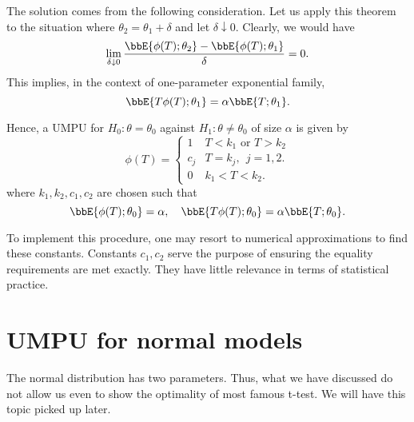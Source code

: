 The solution comes from the following consideration.
Let us apply this theorem to the situation where
$\theta_2 = \theta_1 + \delta$ and let $\delta \downarrow 0$.
Clearly, we would have
\[
\lim_{\delta \downarrow 0} \frac{\bbE\{ \phi(T); \theta_2 \} - \bbE\{ \phi(T); \theta_1 \}}{\delta} = 0.
\]
This implies, in the context of one-parameter exponential family,
\[
\bbE\{ T \phi(T); \theta_1 \} = \alpha \bbE\{ T; \theta_1 \}.
\]

Hence, a UMPU for $H_0: \theta = \theta_0$ 
against $H_1: \theta \neq \theta_0$
 of size $\alpha$ is given by
\[
\phi(T)
=
\left \{
\begin{array}{ll}
1  & T  < k_1 \mbox{  or  } T > k_2\\
c_j &   T= k_j,~~ j=1, 2.\\
0  & k_1 < T < k_2.
\end{array}
\right .
\]
where $k_1, k_2, c_1, c_2$ are chosen such that
\[
\bbE\{ \phi(T); \theta_0 \} = \alpha, ~~~\bbE\{ T \phi(T); \theta_0 \} = \alpha \bbE\{ T; \theta_0 \}.
\]

To implement this procedure, one may resort to numerical approximations
to find these constants. Constants $c_1, c_2$ serve the purpose of ensuring
the equality requirements are met exactly. They have little relevance in terms
of statistical practice.

\section{UMPU for normal models}
The normal distribution has two parameters. Thus, what
we have discussed do not allow us even to show the
optimality of most famous t-test. We will have this topic picked up later.

